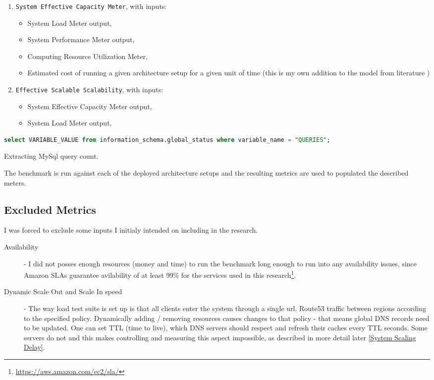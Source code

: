 \documentclass{uvamscse}
\begin{document}
\begin{enumerate}
  \item \texttt{System Effective Capacity Meter}, with inputs:
    \begin{itemize}
      \item System Load Meter output,
      \item System Performance Meter output,
      \item Computing Resource Utilization Meter,
      \item Estimated cost of running a given architecture setup for a given unit of time (this is my own addition to the model from literature \cite{Models})
    \end{itemize}
  \item \texttt{Effective Scalable Scalability}, with inputs:
    \begin{itemize}
      \item System Effective Capacity Meter output,
      \item System Load Meter output,
    \end{itemize}
\end{enumerate}

\begin{sourcecode}
\begin{lstlisting}[style=mono, language=SQL]
select VARIABLE_VALUE from information_schema.global_status where variable_name = "QUERIES";
\end{lstlisting}
\caption{Extracting MySql query count.}
\label{lstlisting:qcount}
\end{sourcecode}

The benchmark is run against each of the deployed architecture setups and the resulting metrics are used to populated the described meters.

\subsection{Excluded Metrics}\label{Excluded Metrics}

I was forced to exclude some inputs I initialy intended on including in the research.

\begin{description}
  \item[Availability] - I did not posses enough resources (money and time) to run the benchmark long enough to run into any availability issues, since Amazon SLAs guarantee avilability of at least 99\% for the services used in this research\footnote{\url{https://aws.amazon.com/ec2/sla/}}.
  \item[Dynamic Scale Out and Scale In speed] - The way load test suite is set up is that all clients enter the system through a single url. Route53 traffic between regions according to the specified policy. Dynamically adding / removing resources causes changes to that policy - that means global DNS records need to be updated. One can set TTL (time to live), which DNS servers should respect and refresh their caches every TTL seconds. Some servers do not and this makes controlling and measuring this aspect impossible, as described in more detail later \ref{System Scaling Delay}.
\end{description}
\end{document}
